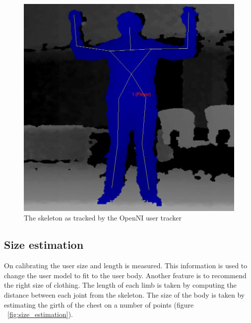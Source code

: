 \documentclass[twocolumn,a4paper]{article}
\begin{document}
 \begin{figure}[htp]
\centering
\includegraphics[scale=0.2]{usertracker.png} 
\caption{The skeleton as tracked by the OpenNI user tracker}
\label{fig:skeleton}
\end{figure}

\subsection{Size estimation}
\label{sec:size_estimation}

On calibrating the user size and length is measured. This information is used to change the user model to fit to the user body. Another feature is to recommend the right size of clothing. The length of each limb is taken by computing the distance between each joint from the skeleton.
The size of the body is taken by estimating the girth of the chest on a number of points (figure ~\ref{fig:size_estimation}).
\end{document}
